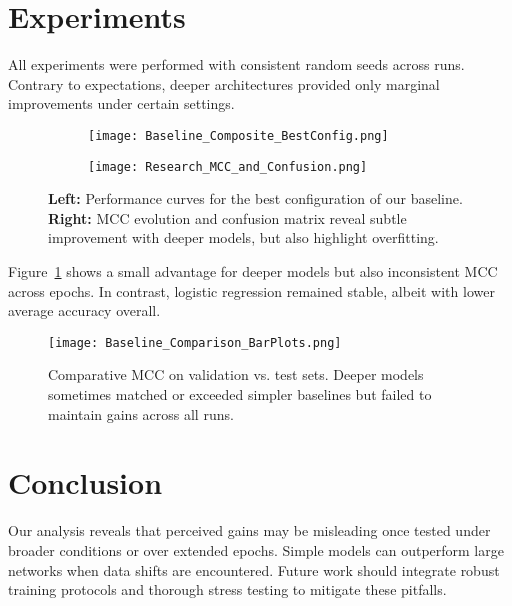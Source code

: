 \documentclass{iclr2025_conference}
\begin{document}
\section{Experiments}
All experiments were performed with consistent random seeds across runs. Contrary to expectations, deeper architectures provided only marginal improvements under certain settings. 

\begin{figure}[t!]
\centering
\begin{subfigure}[b]{0.49\textwidth}
   \texttt{[image: Baseline\_Composite\_BestConfig.png]}
\end{subfigure}
\hfill
\begin{subfigure}[b]{0.49\textwidth}
   \texttt{[image: Research\_MCC\_and\_Confusion.png]}
\end{subfigure}
\caption{\textbf{Left:} Performance curves for the best configuration of our baseline. \textbf{Right:} MCC evolution and confusion matrix reveal subtle improvement with deeper models, but also highlight overfitting.}
\label{fig:results_baseline_research}
\end{figure}

Figure~\ref{fig:results_baseline_research} shows a small advantage for deeper models but also inconsistent MCC across epochs. In contrast, logistic regression remained stable, albeit with lower average accuracy overall.

\begin{figure}[t!]
\centering
\texttt{[image: Baseline\_Comparison\_BarPlots.png]}
\caption{Comparative MCC on validation vs. test sets. Deeper models sometimes matched or exceeded simpler baselines but failed to maintain gains across all runs.}
\label{fig:baseline_comparison_barplots}
\end{figure}

\section{Conclusion}
Our analysis reveals that perceived gains may be misleading once tested under broader conditions or over extended epochs. Simple models can outperform large networks when data shifts are encountered. Future work should integrate robust training protocols and thorough stress testing to mitigate these pitfalls.

\clearpage



\appendix
\end{document}
